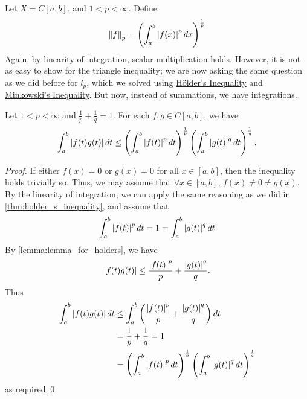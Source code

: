 \documentclass[notoc,notitlepage]{tufte-book}
\newcommand{\norm}[1]{\left\| #1 \right\|}
\begin{document}
\begin{eg}
  Let $X = C[a, b]$, and $1 < p < \infty$. Define
  \begin{equation*}
    \norm{f}_p = \left( \int_{a}^{b} \abs{f(x)}^p \dif{x} \right)^{\frac{1}{p}}
  \end{equation*}
  Again, by linearity of integration, scalar multiplication holds. However, it is not as easy to show for the triangle inequality; we are now asking the same question as we did before for $l_p$, which we solved using \hyperref[thm:holder_s_inequality]{H\"{o}lder's Inequality} and \hyperref[thm:minkowshi_s_inequality]{Minkowski's Inequality}. But now, instead of summations, we have integrations.
\end{eg}

\begin{thm}\label{thm:holder_s_inequality_v2}
  Let $1 < p < \infty$ and $\frac{1}{p} + \frac{1}{q} = 1$. For each $f, g \in C[a, b]$, we have
  \begin{equation*}
    \int_{a}^{b} \left|f(t)g(t)\right| \mathop{}\!d{t} \leq \left( \int_{a}^{b} \left|f(t)\right|^p \mathop{}\!d{t} \right)^\frac{1}{p} \left( \int_{a}^{b} \left|g(t)\right|^q \mathop{}\!d{t} \right)^\frac{1}{q}.
  \end{equation*}
\end{thm}

\begin{proof}
  If either $f(x) = 0$ or $g(x) = 0$ for all $x \in [a, b]$, then the inequality holds trivially so. Thus, we may assume that $\forall x \in [a, b]$, $f(x) \neq 0 \neq g(x)$. By the linearity of integration, we can apply the same reasoning as we did in \cref{thm:holder_s_inequality}, and assume that
  \begin{equation*}
    \int_{a}^{b} \left|f(t)\right|^p \mathop{}\!d{t} = 1 = \int_{a}^{b} \left|g(t)\right|^q \mathop{}\!d{t} 
  \end{equation*}
  By \cref{lemma:lemma_for_holders}, we have
  \begin{equation*}
    \left|f(t) g(t)\right| \leq \frac{\left|f(t)\right|^p}{p} + \frac{\left|g(t)\right|^q}{q}.
  \end{equation*}
  Thus
  \begin{align*}
    \int_{a}^{b} \left|f(t) g(t)\right| \mathop{}\!d{t} &\leq \int_{a}^{b} \left( \frac{\left|f(t)\right|^p}{p} + \frac{\left|g(t)\right|^q}{q} \right) \mathop{}\!d{t} \\
                                         &= \frac{1}{p} + \frac{1}{q} = 1 \\
                                         &= \left( \int_{a}^{b} \left|f(t)\right|^p \mathop{}\!d{t} \right)^\frac{1}{p} \left( \int_{a}^{b} \left|g(t)\right|^q \mathop{}\!d{t} \right)^\frac{1}{q}
  \end{align*}
  as required.\qed
\end{proof}
\end{document}
